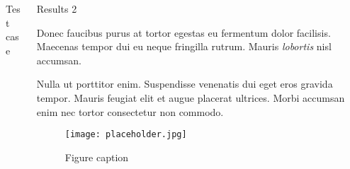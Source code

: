 \documentclass[final]{beamer}
\newlength{\onecolwid}
\newlength{\twocolwid}
\begin{document}
\begin{frame}[t]
\begin{columns}[t]
\begin{column}{\twocolwid}
\begin{columns}[t,totalwidth=\twocolwid]
\begin{column}{\onecolwid}
\begin{block}{Test case}
\end{block}


\end{column} %

\begin{column}{\onecolwid}\vspace{-.6in} %


\begin{block}{Results 2}

Donec faucibus purus at tortor egestas eu fermentum dolor facilisis. Maecenas tempor dui eu neque fringilla rutrum. Mauris \emph{lobortis} nisl accumsan.

Nulla ut porttitor enim. Suspendisse venenatis dui eget eros gravida tempor. Mauris feugiat elit et augue placerat ultrices. Morbi accumsan enim nec tortor consectetur non commodo.

\begin{figure}[H]
\texttt{[image: placeholder.jpg]}
\caption{Figure caption}
\end{figure}

\end{block}


\end{column} %

\end{columns} %





\end{column}
\end{columns}
\end{frame}
\end{document}
